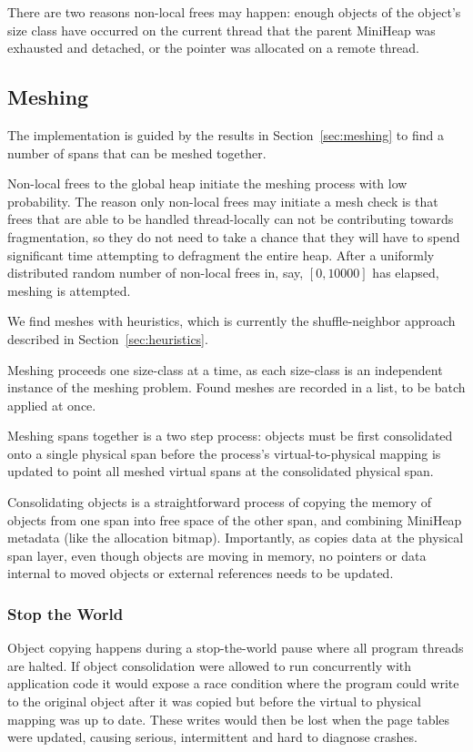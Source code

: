 There are two reasons non-local frees may happen: enough objects of
the object's size class have occurred on the current thread that the
parent MiniHeap was exhausted and detached, or the pointer was
allocated on a remote thread.

\subsection{Meshing}

The \Mesh implementation is guided by the results in
Section~\ref{sec:meshing} to find a number of spans that can be meshed
together.

Non-local frees to the global heap initiate the meshing process with
low probability.  The reason only non-local frees may initiate a mesh
check is that frees that are able to be handled thread-locally can not
be contributing towards fragmentation, so they do not need to take a
chance that they will have to spend significant time attempting to
defragment the entire heap.  After a uniformly distributed random
number of non-local frees in, say, $[0,10000]$ has elapsed, meshing is
attempted.

We find meshes with heuristics, which is currently the
shuffle-neighbor approach described in Section~\ref{sec:heuristics}.

Meshing proceeds one size-class at a time, as each size-class is an
independent instance of the meshing problem.  Found meshes are
recorded in a list, to be batch applied at once.

Meshing spans together is a two step process: objects must be first
consolidated onto a single physical span before the process's
virtual-to-physical mapping is updated to point all meshed virtual
spans at the consolidated physical span.

Consolidating objects is a straightforward process of copying the
memory of objects from one span into free space of the other span, and
combining MiniHeap metadata (like the allocation bitmap).
Importantly, as \Mesh copies data at the physical span layer, even
though objects are moving in memory, no pointers or data internal to
moved objects or external references needs to be updated.

\subsubsection{Stop the World}

Object copying happens during a stop-the-world pause where all program
threads are halted.  If object consolidation were allowed to run
concurrently with application code it would expose a race condition
where the program could write to the original object after it was
copied but before the virtual to physical mapping was up to date.
These writes would then be lost when the page tables were updated,
causing serious, intermittent and hard to diagnose crashes.

